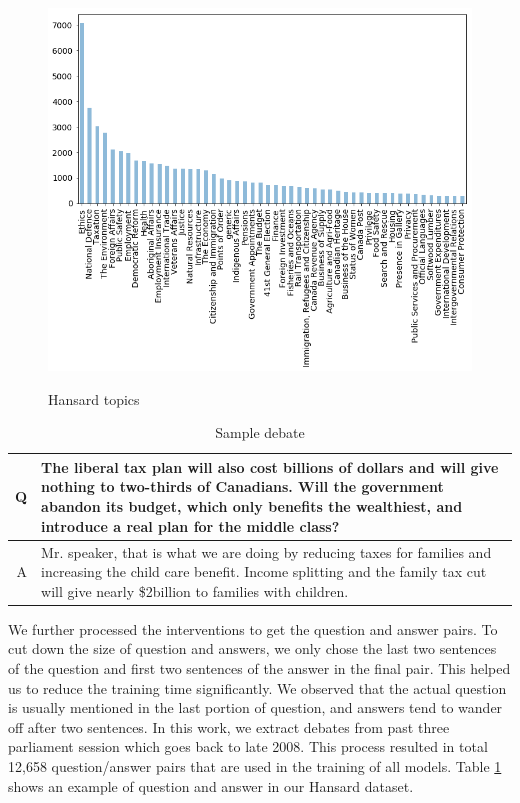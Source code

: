 \begin{figure}[!ht]
  	\caption{Hansard topics}
	\includegraphics[width=\linewidth]{img/hansard_info}
  	\label{fig:hansard_info}
\end{figure}

\vspace{-0.75em}

\begin{table}[ht]
\centering
\caption{Sample debate}
\label{table:debate}
\begin{tabularx}{\columnwidth}{r X}
\hline
Q & The liberal tax plan will also cost billions of dollars and will give nothing to two-thirds of Canadians. Will the government abandon its budget, which only benefits the wealthiest, and introduce a real plan for the middle class? \\ \hline
A & Mr. speaker, that is what we are doing by reducing taxes for families and increasing the child care benefit. Income splitting and the family tax cut will give nearly \$2billion to families with children.  \\ \hline
\end{tabularx}
\end{table}
\vspace{-0.75em}

We further processed the interventions to get the question and answer pairs. To cut down the size of question and answers, we only chose the last two sentences of the question and first two sentences of the answer in the final pair. This helped us to reduce the training time significantly. We observed that the actual question is usually mentioned in the last portion of question, and answers tend to wander off after two sentences. In this work, we extract debates from past three parliament session which goes back to late 2008. This process resulted in total 12,658 question/answer pairs that are used in the training of all models. Table \ref{table:debate} shows an example of question and answer in our Hansard dataset.


